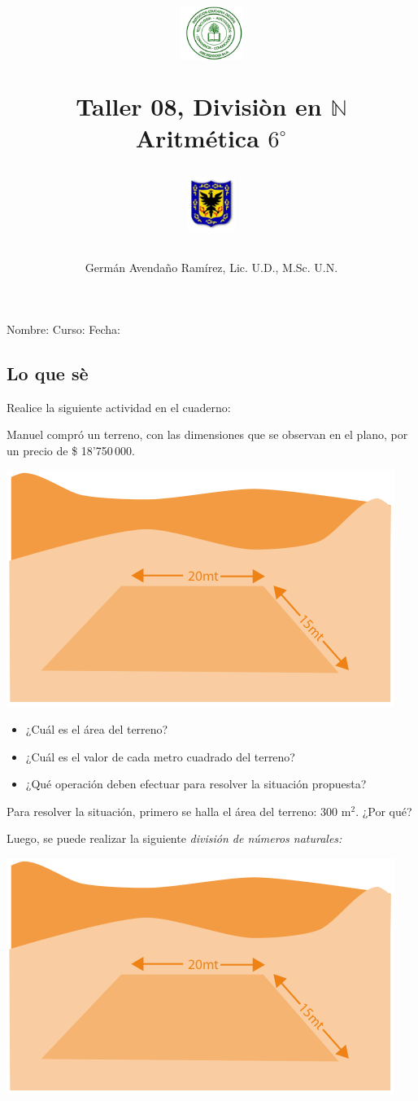 \documentclass[letterpaper,11pt,twoside]{article}
\author{Germ\'an Avenda\~no Ram\'irez, Lic. U.D., M.Sc. U.N.}
\title{\begin{minipage}{.2\textwidth}
\includegraphics[height=1.75cm]{Images/logo-colegio.png}\end{minipage}
\begin{minipage}{.55\textwidth}
\begin{center}
Taller 08, Divisi\`{o}n en $\mathbb{N}$\\
Aritmética $6^{\circ}$
\end{center}
\end{minipage}\hfill
\begin{minipage}{.2\textwidth}
\includegraphics[height=1.75cm]{Images/logo-sed.png} 
\end{minipage}}
\date{}
\begin{document}
\maketitle
Nombre: \hrulefill Curso: \underline{\hspace*{44pt}} Fecha: \underline{\hspace*{2.5cm}}
\begin{multicols}{2}
\section*{Lo que s\`{e}}
Realice la siguiente actividad en el cuaderno:

Manuel compró un terreno, con las dimensiones que se observan en el plano, por un precio de \$ 18'750\,000.
\begin{center}
\includegraphics[scale=.5]{Images/terreno.png} 
\end{center}
\begin{itemize}
\item ¿Cuál es el área del terreno?
\item ¿Cuál es el valor de cada metro cuadrado del terreno?
\item ¿Qué operación deben efectuar para resolver la situación propuesta?
\end{itemize}
Para resolver la situación, primero se halla el área del terreno: 300 m$^{2}$. ¿Por qué?

Luego, se puede realizar la siguiente \emph{división de números naturales:}
\begin{center}
\includegraphics[scale=.5]{Images/terreno.png} 
\end{center}
\end{multicols}
\end{document}
